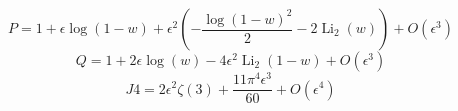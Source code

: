 \[P = 1 + \epsilon \log{\left(1 - w \right)} + \epsilon^{2} \left(- \frac{\log{\left(1 - w \right)}^{2}}{2} - 2 \operatorname{Li}_{2}\left(w\right)\right) + O\left(\epsilon^{3}\right)\]
\[Q = 1 + 2 \epsilon \log{\left(w \right)} - 4 \epsilon^{2} \operatorname{Li}_{2}\left(1 - w\right) + O\left(\epsilon^{3}\right)\]
\[J4 = 2 \epsilon^{2} \zeta\left(3\right) + \frac{11 \pi^{4} \epsilon^{3}}{60} + O\left(\epsilon^{4}\right)\]
